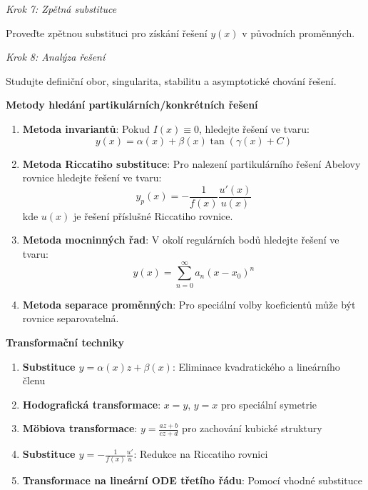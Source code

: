 \vspace{1\baselineskip}

\noindent\textit{Krok 7: Zpětná substituce}

Proveďte zpětnou substituci pro získání řešení $y(x)$ v původních proměnných.

\vspace{1\baselineskip}

\noindent\textit{Krok 8: Analýza řešení}

Studujte definiční obor, singularita, stabilitu a asymptotické chování řešení.

\vspace{1\baselineskip}

\noindent\textbf{Metody hledání partikulárních/konkrétních řešení}

\begin{enumerate}
\item \textbf{Metoda invariantů}: Pokud $I(x) \equiv 0$, hledejte řešení ve tvaru:
\[
y(x) = \alpha(x) + \beta(x)\tan(\gamma(x) + C)
\]

\item \textbf{Metoda Riccatiho substituce}: Pro nalezení partikulárního řešení Abelovy rovnice hledejte řešení ve tvaru:
\[
y_p(x) = -\frac{1}{f(x)}\frac{u'(x)}{u(x)}
\]
kde $u(x)$ je řešení příslušné Riccatiho rovnice.

\item \textbf{Metoda mocninných řad}: V okolí regulárních bodů hledejte řešení ve tvaru:
\[
y(x) = \sum_{n=0}^\infty a_n (x - x_0)^n
\]

\item \textbf{Metoda separace proměnných}: Pro speciální volby koeficientů může být rovnice separovatelná.
\end{enumerate}

\vspace{1\baselineskip}

\noindent\textbf{Transformační techniky}

\begin{enumerate}
\item \textbf{Substituce $y = \alpha(x)z + \beta(x)$}: Eliminace kvadratického a lineárního členu

\item \textbf{Hodografická transformace}: $x = y$, $y = x$ pro speciální symetrie

\item \textbf{Möbiova transformace}: $y = \frac{az + b}{cz + d}$ pro zachování kubické struktury

\item \textbf{Substituce $y = -\frac{1}{f(x)}\frac{u'}{u}$}: Redukce na Riccatiho rovnici

\item \textbf{Transformace na lineární ODE třetího řádu}: Pomocí vhodné substituce
\end{enumerate}

